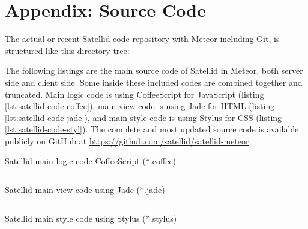 \chapter{Appendix: Source Code}
\label{apx:source-code}

The actual or recent Satellid code repository with Meteor including Git, is structured like this directory tree:


\noindent The following listings are the main source code of Satellid in Meteor, both server side and client side.
Some inside these included codes are combined together and truncated.
Main logic code is using CoffeeScript for JavaScript (listing \autoref{lst:satellid-code-coffee}), main view code is using Jade for HTML (listing \autoref{lst:satellid-code-jade}), and main style code is using Stylus for CSS (listing \autoref{lst:satellid-code-styl}).
The complete and most updated source code is available publicly on GitHub at \url{https://github.com/satellid/satellid-meteor}.

\begin{listing}[tbp]
  \caption[Satellid main logic code]{Satellid main logic code CoffeeScript (*.coffee)}
  \inputminted{coffeescript}{\dir/code/.snippets/satellid.coffee}
  \label{lst:satellid-code-coffee}
\end{listing}

\begin{listing}[tbp]
  \caption[Satellid main view code]{Satellid main view code using Jade (*.jade)}
  \inputminted{jade}{\dir/code/.snippets/satellid.jade}
  \label{lst:satellid-code-jade}
\end{listing}

\begin{listing}[tbp]
  \caption[Satellid main style code]{Satellid main style code using Stylus (*.stylus)}
  \inputminted{css}{\dir/code/.snippets/satellid.styl}
  \label{lst:satellid-code-styl}
\end{listing}
